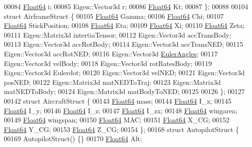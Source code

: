 \begin{DoxyCode}
00084     \hyperlink{group___tools_ga3f1431cb9f76da10f59246d1d743dc2c}{Float64}  i;                      
00085     Eigen::Vector3d r;
00086     \hyperlink{group___tools_ga3f1431cb9f76da10f59246d1d743dc2c}{Float64}  Kt;                     
00087 \};
00088 
00104 \textcolor{keyword}{struct }AirframeStruct \{
00105     \hyperlink{group___tools_ga3f1431cb9f76da10f59246d1d743dc2c}{Float64} Gamma;
00106     \hyperlink{group___tools_ga3f1431cb9f76da10f59246d1d743dc2c}{Float64} Chi;
00107     \hyperlink{group___tools_ga3f1431cb9f76da10f59246d1d743dc2c}{Float64} StickPosition;   
00108     \hyperlink{group___tools_ga3f1431cb9f76da10f59246d1d743dc2c}{Float64} Eta;
00109     \hyperlink{group___tools_ga3f1431cb9f76da10f59246d1d743dc2c}{Float64} Xi;
00110     \hyperlink{group___tools_ga3f1431cb9f76da10f59246d1d743dc2c}{Float64} Zeta;
00111     Eigen::Matrix3d intertiaTensor;
00112     Eigen::Vector3d accTransBody;
00113     Eigen::Vector3d accRotBody;
00114     Eigen::Vector3d accTransNED;
00115     Eigen::Vector3d accRotNED;
00116     Eigen::Vector3d \hyperlink{class_euler_angles}{EulerAngles};
00117     Eigen::Vector3d velBody;
00118     Eigen::Vector3d rotRatesBody;
00119     Eigen::Vector3d Eulerdot;
00120     Eigen::Vector3d velNED;
00121     Eigen::Vector3d posNED;
00122     Eigen::Matrix3d matNEDToTraj;
00123     Eigen::Matrix3d matNEDToBody;
00124     Eigen::Matrix3d matBodyToNED;
00125 
00126 \};
00127 
00142 \textcolor{keyword}{struct }AircraftStruct \{
00143     \hyperlink{group___tools_ga3f1431cb9f76da10f59246d1d743dc2c}{Float64}  mass;
00144     \hyperlink{group___tools_ga3f1431cb9f76da10f59246d1d743dc2c}{Float64}  I\_x;
00145     \hyperlink{group___tools_ga3f1431cb9f76da10f59246d1d743dc2c}{Float64}   I\_y;
00146     \hyperlink{group___tools_ga3f1431cb9f76da10f59246d1d743dc2c}{Float64}  I\_z;
00147     \hyperlink{group___tools_ga3f1431cb9f76da10f59246d1d743dc2c}{Float64}  I\_zx;
00148     \hyperlink{group___tools_ga3f1431cb9f76da10f59246d1d743dc2c}{Float64}  wingarea;
00149     \hyperlink{group___tools_ga3f1431cb9f76da10f59246d1d743dc2c}{Float64}  wingspan;
00150     \hyperlink{group___tools_ga3f1431cb9f76da10f59246d1d743dc2c}{Float64}  MAC;
00151     \hyperlink{group___tools_ga3f1431cb9f76da10f59246d1d743dc2c}{Float64}  X\_CG;
00152     \hyperlink{group___tools_ga3f1431cb9f76da10f59246d1d743dc2c}{Float64}  Y\_CG;
00153     \hyperlink{group___tools_ga3f1431cb9f76da10f59246d1d743dc2c}{Float64}  Z\_CG;
00154 \};
00168 \textcolor{keyword}{struct }AutopilotStruct \{
00169     AutopilotStruct() \{\}
00170         \hyperlink{group___tools_ga3f1431cb9f76da10f59246d1d743dc2c}{Float64} Alt;

\end{DoxyCode}

